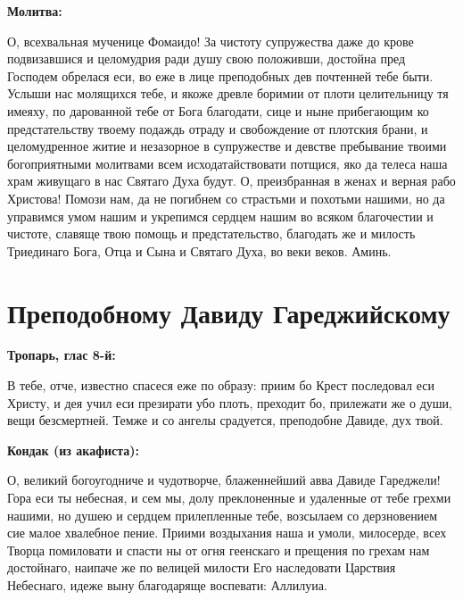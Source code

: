 \bfseries Молитва:\normalfont{}\nopagebreak

 О, всехвальная мученице Фомаидо! За чистоту супружества даже до крове подвизавшися и целомудрия ради душу свою положивши, достойна пред Господем обрелася еси, во еже в лице преподобных дев почтенней тебе быти. Услыши нас молящихся тебе, и якоже древле боримии от плоти целительницу тя имеяху, по дарованной тебе от Бога благодати, сице и ныне прибегающим ко предстательству твоему подаждь отраду и свобождение от плотския брани, и целомудренное житие и незазорное в супружестве и девстве пребывание твоими богоприятными молитвами всем исходатайствовати потщися, яко да телеса наша храм живущаго в нас Святаго Духа будут. О, преизбранная в женах и верная рабо Христова! Помози нам, да не погибнем со страстьми и похотьми нашими, но да управимся умом нашим и укрепимся сердцем нашим во всяком благочестии и чистоте, славяще твою помощь и предстательство, благодать же и милость Триединаго Бога, Отца и Сына и Святаго Духа, во веки веков. Аминь. \mychapterending


 

\section{Преподобному Давиду Гареджийскому}
 


\bfseries Тропарь, глас 8-й:\normalfont{}\nopagebreak


В тебе, отче, известно спасеся еже по образу: приим бо Крест последовал еси Христу, и дея учил еси презирати убо плоть, преходит бо, прилежати же о души, вещи безсмертней. Темже и со ангелы срадуется, преподобне Давиде, дух твой.


\medskip


\bfseries Кондак (из акафиста):\normalfont{}\nopagebreak


О, великий богоугодниче и чудотворче, блаженнейший авва Давиде Гареджели! Гора еси ты небесная, и сем мы, долу преклоненные и удаленные от тебе грехми нашими, но душею и сердцем прилепленные тебе, возсылаем со дерзновением сие малое хвалебное пение. Приими воздыхания наша и умоли, милосерде, всех Творца помиловати и спасти ны от огня геенскаго и прещения по грехам нам достойнаго, наипаче же по велицей милости Его наследовати Царствия Небеснаго, идеже выну благодаряще воспевати: Аллилуиа.


